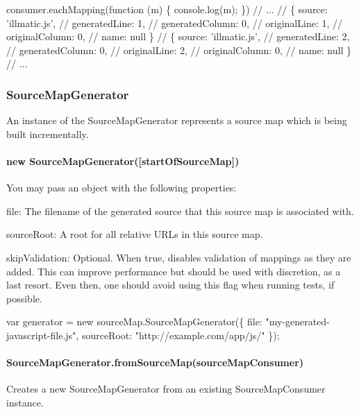 \begin{DoxyCode}
consumer.eachMapping(function (m) \{ console.log(m); \})
// ...
// \{ source: 'illmatic.js',
//   generatedLine: 1,
//   generatedColumn: 0,
//   originalLine: 1,
//   originalColumn: 0,
//   name: null \}
// \{ source: 'illmatic.js',
//   generatedLine: 2,
//   generatedColumn: 0,
//   originalLine: 2,
//   originalColumn: 0,
//   name: null \}
// ...
\end{DoxyCode}
 \subsubsection*{Source\+Map\+Generator}

An instance of the Source\+Map\+Generator represents a source map which is being built incrementally.

\paragraph*{new Source\+Map\+Generator(\mbox{[}start\+Of\+Source\+Map\mbox{]})}

You may pass an object with the following properties\+:


\begin{DoxyItemize}
\item {\ttfamily file}\+: The filename of the generated source that this source map is associated with.
\item {\ttfamily source\+Root}\+: A root for all relative U\+R\+Ls in this source map.
\item {\ttfamily skip\+Validation}\+: Optional. When {\ttfamily true}, disables validation of mappings as they are added. This can improve performance but should be used with discretion, as a last resort. Even then, one should avoid using this flag when running tests, if possible.
\end{DoxyItemize}


\begin{DoxyCode}
var generator = new sourceMap.SourceMapGenerator(\{
  file: "my-generated-javascript-file.js",
  sourceRoot: "http://example.com/app/js/"
\});
\end{DoxyCode}


\paragraph*{Source\+Map\+Generator.\+from\+Source\+Map(source\+Map\+Consumer)}

Creates a new {\ttfamily Source\+Map\+Generator} from an existing {\ttfamily Source\+Map\+Consumer} instance.


